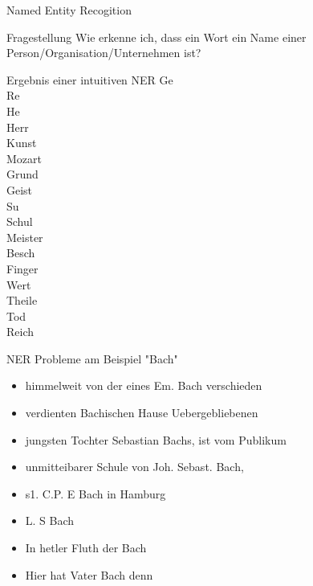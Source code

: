 \documentclass[aspectratio=169]{beamer}
\begin{document}
\begin{frame}{Named Entity Recogition}
	\begin{block}{Fragestellung}
		Wie erkenne ich, dass ein Wort ein Name einer Person/Organisation/Unternehmen ist?
	\end{block}

\end{frame}
\begin{frame}{Ergebnis einer intuitiven NER}
	Ge\\
	Re\\
	He\\
	Herr\\
	Kunst\\
	Mozart\\
	Grund\\
	Geist\\
	Su\\
	Schul\\
	Meister\\
	Besch\\
	Finger\\
	Wert\\
	Theile\\
	Tod\\
	Reich\\
\end{frame}
\begin{frame}{NER Probleme am Beispiel "Bach"}
	\begin{itemize}
		\item \glqq himmelweit von der eines Em. Bach verschieden\grqq
		\item \glqq verdienten Bachischen Hause Uebergebliebenen\grqq
		\item \glqq jungsten Tochter Sebastian Bachs, ist vom Publikum\grqq
		\item \glqq unmitteibarer Schule von Joh. Sebast. Bach,\grqq
		\item \glqq s1. C.P. E Bach in Hamburg\grqq
		\item \glqq L. S Bach\grqq
		\item \glqq  In hetler Fluth der Bach\grqq
		\item \glqq Hier hat Vater Bach denn\grqq
	\end{itemize}
\end{frame}
\end{document}
